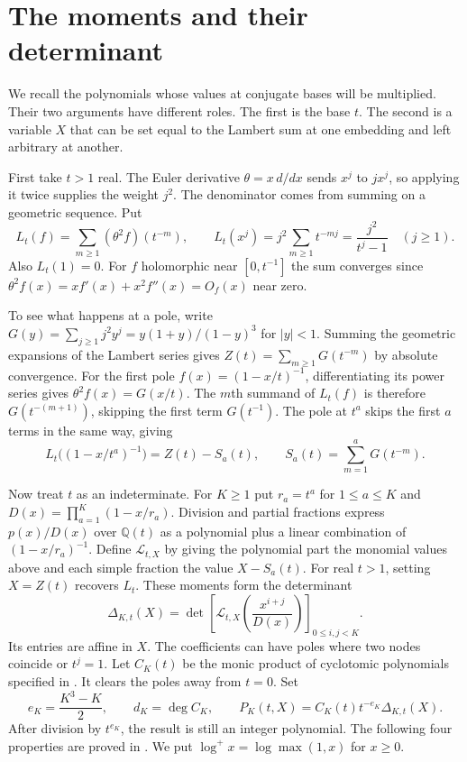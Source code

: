 \documentclass[11pt,letterpaper]{article}
\numberwithin{equation}{section}
\newcommand{\Q}{\mathbb Q}
\newcommand{\lp}{\log^{+}}
\begin{document}
\section{The moments and their determinant}\label{sec:inputs}

We recall the polynomials whose values at conjugate bases will be multiplied.
Their two arguments have different roles. The first is the base \(t\).
The second is a variable \(X\) that can be set equal to the Lambert
sum at one embedding and left arbitrary at another.

First take \(t>1\) real. The Euler derivative \(\theta=x\,d/dx\)
sends \(x^j\) to \(jx^j\), so applying it twice supplies the weight
\(j^2\). The denominator comes from summing on a geometric sequence. Put
\[
 L_t(f)=\sum_{m\ge1}(\theta^2 f)(t^{-m}),\qquad
 L_t(x^j)=j^2\sum_{m\ge1}t^{-mj}=\frac{j^2}{t^j-1}\quad(j\ge1).
\]
Also \(L_t(1)=0\). For \(f\) holomorphic near \([0,t^{-1}]\) the sum
converges since \(\theta^2f(x)=xf'(x)+x^2f''(x)=O_f(x)\) near zero.

To see what happens at a pole, write
\(G(y)=\sum_{j\ge1}j^2y^j=y(1+y)/(1-y)^3\) for \(|y|<1\).
Summing the geometric expansions of the Lambert series gives
\(Z(t)=\sum_{m\ge1}G(t^{-m})\) by absolute convergence.
For the first pole \(f(x)=(1-x/t)^{-1}\), differentiating its power
series gives \(\theta^2 f(x)=G(x/t)\). The \(m\)th summand of \(L_t(f)\)
is therefore \(G(t^{-(m+1)})\), skipping the first term \(G(t^{-1})\).
The pole at \(t^a\) skips the first \(a\) terms in the same way, giving
\[
 L_t\big((1-x/t^a)^{-1}\big)=Z(t)-S_a(t),\qquad
 S_a(t)=\sum_{m=1}^aG(t^{-m}).
\]

Now treat \(t\) as an indeterminate. For \(K\ge1\) put \(r_a=t^a\)
for \(1\le a\le K\) and \(D(x)=\prod_{a=1}^K(1-x/r_a)\).
Division and partial fractions express \(p(x)/D(x)\) over \(\Q(t)\)
as a polynomial plus a linear combination of \((1-x/r_a)^{-1}\).
Define \(\mathcal L_{t,X}\) by giving the polynomial part the monomial
values above and each simple fraction the value \(X-S_a(t)\).
For real \(t>1\), setting \(X=Z(t)\) recovers \(L_t\).
These moments form the determinant
\[
 \Delta_{K,t}(X)=
 \det\left[\mathcal L_{t,X}\!\left(\frac{x^{i+j}}{D(x)}\right)\right]_{0\le i,j<K}.
\]
Its entries are affine in \(X\). The coefficients can have poles where
two nodes coincide or \(t^j=1\). Let \(C_K(t)\) be the monic product of
cyclotomic polynomials specified in \cite[(2.3)]{Previous}. It clears
the poles away from \(t=0\). Set
\[
 e_K=\frac{K^3-K}{2},\qquad d_K=\deg C_K,\qquad
 P_K(t,X)=C_K(t)t^{-e_K}\Delta_{K,t}(X).
\]
After division by \(t^{e_K}\), the result is still an integer polynomial.
The following four properties
are proved in \cite[Lemmas~2.1 and~4.1, Propositions~3.1 and~5.1]{Previous}.
We put \(\lp x=\log\max(1,x)\) for \(x\ge0\).
\end{document}

